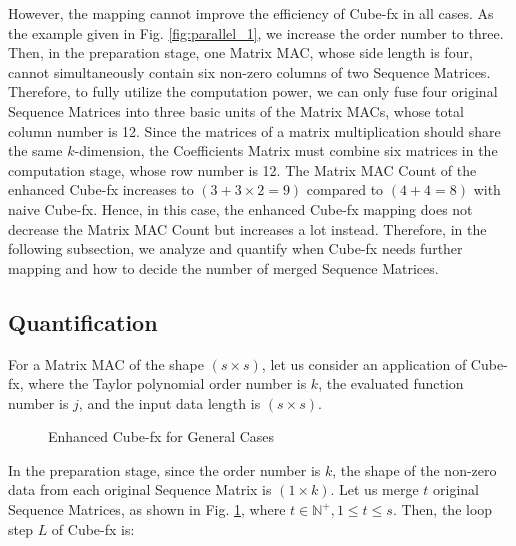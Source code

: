 However, the mapping cannot improve the efficiency of Cube-fx in all cases. As the example given in Fig. \ref{fig:parallel_1}, we increase the order number to three. Then, in the preparation stage, one Matrix MAC, whose side length is four, cannot simultaneously contain six non-zero columns of two Sequence Matrices. Therefore, to fully utilize the computation power, we can only fuse four original Sequence Matrices into three basic units of the Matrix MACs, whose total column number is 12. Since the matrices of a matrix multiplication should share the same $k$-dimension, the Coefficients Matrix must combine six matrices in the computation stage, whose row number is 12. The Matrix MAC Count of the enhanced Cube-fx increases to $(3 + 3 \times 2 = 9)$ compared to $(4 + 4 = 8)$ with naive Cube-fx. Hence, in this case, the enhanced Cube-fx mapping does not decrease the Matrix MAC Count but increases a lot instead. Therefore, in the following subsection, we analyze and quantify when Cube-fx needs further mapping and how to decide the number of merged Sequence Matrices.

\subsection{Quantification \label{sec:qua}}

For a Matrix MAC of the shape $(s \times s)$, let us consider an application of Cube-fx, where the Taylor polynomial order number is $k$, the evaluated function number is $j$, and the input data length is $(s \times s)$. 

\begin{figure}[t]
    \caption{Enhanced Cube-fx for General Cases}
    \label{fig:general}
    \end{figure}

In the preparation stage, since the order number is $k$, the shape of the non-zero data from each original Sequence Matrix is $(1 \times k)$. Let us merge $t$ original Sequence Matrices, as shown in Fig. \ref{fig:general}, where $t \in \mathbb{N}^{+}, 1 \le t \le s$. Then, the loop step $L$ of Cube-fx is:

